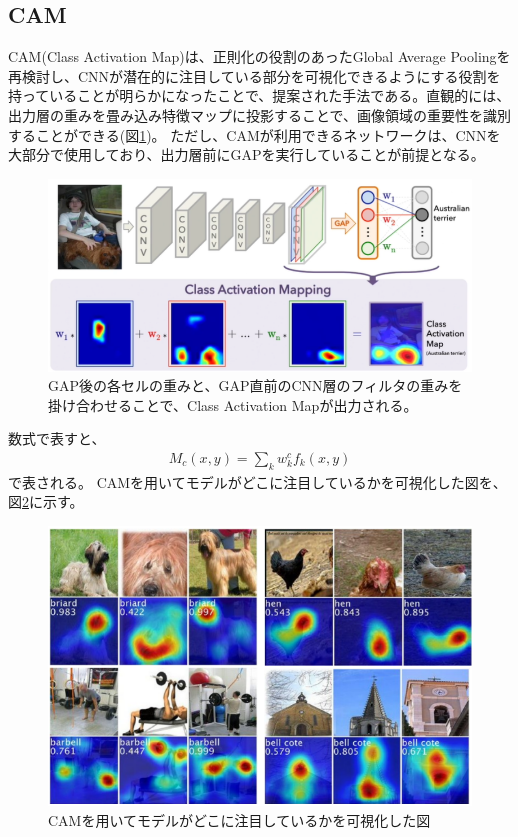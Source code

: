 \documentclass{ltjsarticle}
\begin{document}
\subsection{CAM}
CAM(Class Activation Map)は、正則化の役割のあったGlobal Average Poolingを再検討し、CNNが潜在的に注目している部分を可視化できるようにする役割を持っていることが明らかになったことで、提案された手法である。直観的には、出力層の重みを畳み込み特徴マップに投影することで、画像領域の重要性を識別することができる(図\ref{fig:CAM})。
ただし、CAMが利用できるネットワークは、CNNを大部分で使用しており、出力層前にGAPを実行していることが前提となる。
\begin{figure}
  \centering
  \includegraphics[width=13cm]{./capture/CAM.png}
  \caption{GAP後の各セルの重みと、GAP直前のCNN層のフィルタの重みを掛け合わせることで、Class Activation Mapが出力される。}
  \label{fig:CAM}
\end{figure}
数式で表すと、
\begin{align}
  M_c(x,y) = \sum_{k} w_k^c f_k(x,y)
\end{align}
で表される。
CAMを用いてモデルがどこに注目しているかを可視化した図を、図\ref{fig:CAM_example}に示す。
\begin{figure}[htbp]
  \centering
  \includegraphics[width=13cm]{./capture/CAM_example.png}
  \caption{CAMを用いてモデルがどこに注目しているかを可視化した図}
  \label{fig:CAM_example}
\end{figure}
\end{document}
